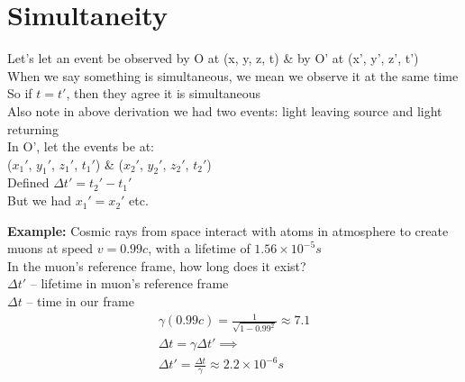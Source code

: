 \documentclass[a4paper, 11pt, fleqn, normalem]{report}
\begin{document}
\section{Simultaneity}
Let's let an event be observed by O at (x, y, z, t) \& by O' at (x', y', z', t') \\
When we say something is simultaneous, we mean we observe it at the same time \\
So if $t = t'$, then they agree it is simultaneous \\
Also note in above derivation we had two events: light leaving source and light returning \\
In O', let the events be at: \\
($x_{1}'$, $y_{1}'$, $z_{1}'$, $t_{1}'$) \& ($x_{2}'$, $y_{2}'$, $z_{2}'$, $t_{2}'$) \\
Defined $\Delta t' = t_{2}' - t_{1}'$ \\
But we had $x_{1}' = x_{2}'$ etc.

\textbf{Example:} Cosmic rays from space interact with atoms in atmosphere to create muons at speed $v = 0.99c$, with a lifetime of $1.56\times10^{-5}s$ \\
In the muon's reference frame, how long does it exist? \\
$\Delta t'$ -- lifetime in muon's reference frame \\
$\Delta t$ -- time in our frame
\begin{gather*}
    \gamma(0.99c) = \frac{1}{\sqrt{1 - 0.99^{2}}} \approx 7.1 \\
    \Delta t = \gamma\Delta t' \implies \\
    \Delta t' = \frac{\Delta t}{\gamma} \approx 2.2\times10^{-6}s
\end{gather*}
\end{document}
